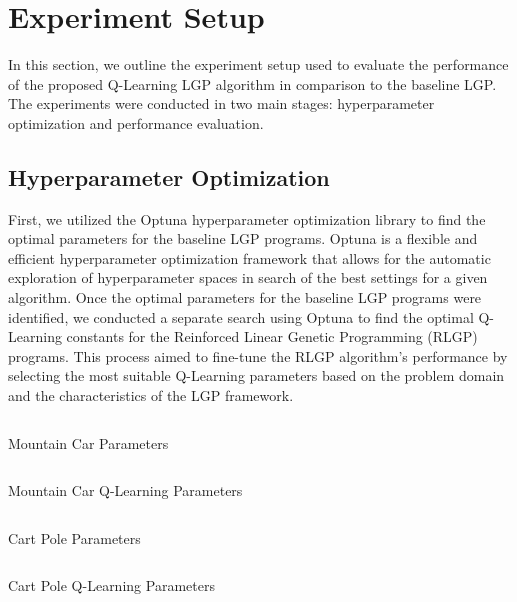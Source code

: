 \documentclass[12pt, final]{dalcsthesis}
\begin{document}
\section{Experiment Setup}

In this section, we outline the experiment setup used to evaluate the performance of the proposed Q-Learning LGP algorithm in comparison to the baseline LGP. The experiments were conducted in two main stages: hyperparameter optimization and performance evaluation.

\subsection{Hyperparameter Optimization}

First, we utilized the Optuna hyperparameter optimization library \cite{akiba2019optuna} to find the optimal parameters for the baseline LGP programs.
Optuna is a flexible and efficient hyperparameter optimization framework that allows for the automatic exploration of hyperparameter spaces in search of the best settings for a given algorithm.
Once the optimal parameters for the baseline LGP programs were identified, we conducted a separate search using Optuna to find the optimal Q-Learning constants for the Reinforced Linear Genetic Programming (RLGP) programs. 
This process aimed to fine-tune the RLGP algorithm's performance by selecting the most suitable Q-Learning parameters based on the problem domain and the characteristics of the LGP framework.

\begin{listing}[hb]
	\centering
	\inputminted[breaklines]{json}{../assets/parameters/mountain-car-lgp.json}
	\caption{Mountain Car Parameters}
	\label{code:mountain-car-parameters}
\end{listing}

\begin{listing}[hb]
	\centering
	\inputminted[breaklines]{json}{../assets/parameters/mountain-car-q.json}
	\caption{Mountain Car Q-Learning Parameters}
	\label{code:mountain-car-q-parameters}
\end{listing}

\begin{listing}[hb]
	\centering
	\inputminted[breaklines]{json}{../assets/parameters/cart-pole-lgp.json}
	\caption{Cart Pole Parameters}
	\label{code:cart-pole-parameters}
\end{listing}

\begin{listing}[hb]
	\centering
	\inputminted[breaklines]{json}{../assets/parameters/cart-pole-q.json}
	\caption{Cart Pole Q-Learning Parameters}
	\label{code:cart-pole-q-parameters}
\end{listing}
\end{document}
